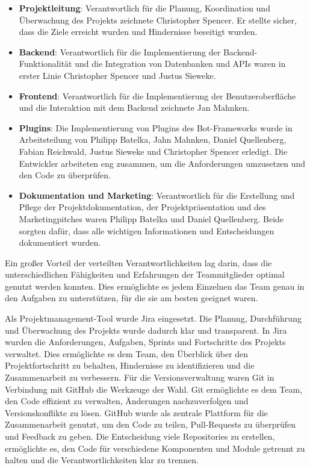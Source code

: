 \begin{itemize}
    \item \textbf{Projektleitung}: Verantwortlich für die Planung, Koordination und Überwachung des Projekts zeichnete Christopher Spencer. Er stellte sicher, dass die Ziele erreicht wurden und Hindernisse beseitigt wurden.
    \item \textbf{Backend}: Verantwortlich für die Implementierung der Backend-Funktionalität und die Integration von Datenbanken und APIs waren in erster Linie Christopher Spencer und Justus Sieweke.
    \item \textbf{Frontend}: Verantwortlich für die Implementierung der Benutzeroberfläche und die Interaktion mit dem Backend zeichnete Jan Mahnken.
    \item \textbf{Plugins}: Die Implementierung von Plugins des Bot-Frameworks wurde in Arbeitsteilung von Philipp Batelka, Jahn Mahnken, Daniel Quellenberg, Fabian Reichwald, Justus Sieweke und Christopher Spencer erledigt. Die Entwickler arbeiteten eng zusammen, um die Anforderungen umzusetzen und den Code zu überprüfen.
    \item \textbf{Dokumentation und Marketing}: Verantwortlich für die Erstellung und Pflege der Projektdokumentation, der Projektpräsentation und des Marketingpitches waren Philipp Batelka und Daniel Quellenberg. Beide sorgten dafür, dass alle wichtigen Informationen und Entscheidungen dokumentiert wurden.
\end{itemize}

Ein großer Vorteil der verteilten Verantwortlichkeiten lag darin, dass die unterschiedlichen Fähigkeiten und Erfahrungen der Teammitglieder optimal genutzt werden konnten. Dies ermöglichte es jedem Einzelnen das Team genau in den Aufgaben zu unterstützen, für die sie am besten geeignet waren. 

Als Projektmanagement-Tool wurde \gls{Jira} eingesetzt. Die Planung, Durchführung und Überwachung des Projekts wurde dadurch klar und transparent. In Jira wurden die Anforderungen, Aufgaben, Sprints und Fortschritte des Projekts verwaltet. Dies ermöglichte es dem Team, den Überblick über den Projektfortschritt zu behalten, Hindernisse zu identifizieren und die Zusammenarbeit zu verbessern. Für die Versionsverwaltung waren \gls{Git} in Verbindung mit \gls{GitHub} die Werkzeuge der Wahl. Git ermöglichte es dem Team, den Code effizient zu verwalten, Änderungen nachzuverfolgen und Versionskonflikte zu lösen. GitHub wurde als zentrale Plattform für die Zusammenarbeit genutzt, um den Code zu teilen, \gls{Pull-Requests} zu überprüfen und Feedback zu geben. Die Entscheidung viele Repositories zu erstellen, ermöglichte es, den Code für verschiedene Komponenten und Module getrennt zu halten und die Verantwortlichkeiten klar zu trennen.


